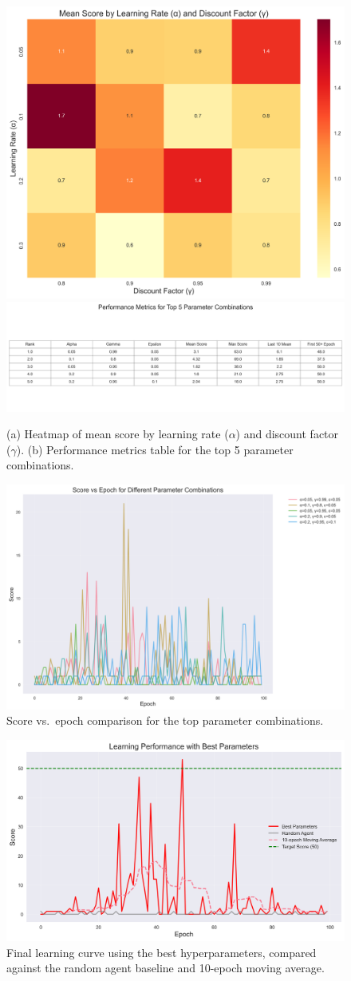 \documentclass[submit]{../harvardml}
\begin{document}
\begin{figure}[h]
  \includegraphics[width=0.45\linewidth]{img_output/parameter_heatmap.png}
  \includegraphics[width=0.45\linewidth]{img_output/performance_table.png}
  \caption{(a) Heatmap of mean score by learning rate ($\alpha$) and discount factor ($\gamma$). (b) Performance metrics table for the top 5 parameter combinations.}
\end{figure}

\begin{figure}[h]
  \includegraphics[width=0.45\linewidth]{img_output/score_vs_epoch_comparison.png}
  \caption{Score vs.\ epoch comparison for the top parameter combinations.}
\end{figure}

\begin{figure}[h]
  \includegraphics[width=0.45\linewidth]{img_output/final_learning_curve.png}
  \caption{Final learning curve using the best hyperparameters, compared against the random agent baseline and 10-epoch moving average.}
\end{figure}
\end{document}
